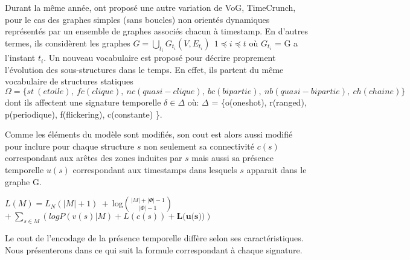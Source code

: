 Durant la même année, \citep{shah2015timecrunch} ont proposé une autre variation de VoG, TimeCrunch, pour le cas des graphes simples (sans boucles) non orientés dynamiques représentés par un ensemble de graphes associés chacun à timestamp. En d'autres termes, ils considèrent les graphes $\displaystyle{G=\bigcup_{t_{i}}G_{t_{i}}(V,E_{t_{i}})}\ \ 1 \preceq i \preceq t$ où $G_{t_{i}}$ = G a l'instant $t_{i}$.
			Un nouveau vocabulaire est proposé pour décrire proprement l'évolution des sous-structures dans le temps. En effet, ils partent du même vocabulaire de structures statiques 
			$\Omega =\{ st\ (etoile),\ fc (clique),\ nc (quasi-clique),\ bc (bipartie),\ nb (quasi-bipartie),\ ch (chaine)\}$ 
			dont ils affectent une signature temporelle $\delta \in \Delta$ où: $\Delta$ = \{o(oneshot), r(ranged), p(periodique), f(flickering), c(constante) \}. 
			
			 Comme les éléments du modèle sont modifiés, son cout est alors aussi modifié pour inclure pour chaque structure $s$ non seulement sa connectivité $c(s)$ correspondant aux arêtes des zones induites par $s$ mais aussi sa présence temporelle $u(s)$ correspondant aux timestamps dans lesquels $s$ apparait dans le graphe G. 
			 
			 $L(M) = L_{N}(|M|+1)\ +\ $log${|M|+|\Phi|-1}\choose{|\Phi|-1}$ $+\ \displaystyle{\sum_{s\in M}(logP(v(s)|M) + L(c(s)) + \textbf{L(u(s))})}$
			 
			 Le cout de l'encodage de la présence temporelle diffère selon ses caractéristiques. Nous présenterons dans ce qui suit la formule correspondant à chaque signature.
			 
